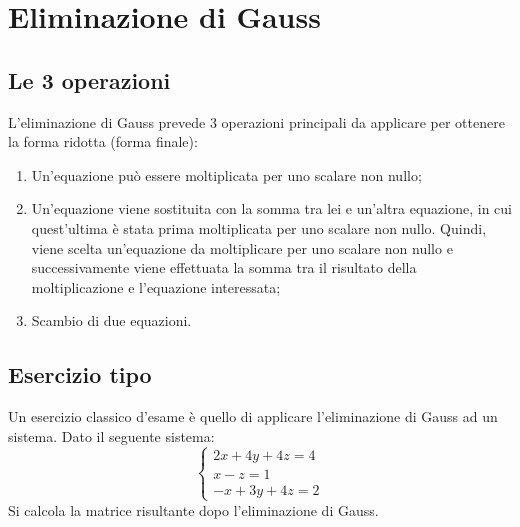 \documentclass[a4paper]{article}
\begin{document}
	\section{Eliminazione di Gauss}
	
	\subsection{Le 3 operazioni}
	
	L'eliminazione di Gauss prevede 3 operazioni principali da applicare per ottenere la forma ridotta (forma finale):
	\begin{enumerate}
		\item Un'equazione può essere moltiplicata per uno scalare non nullo;
		
		\item Un'equazione viene sostituita con la somma tra lei e un'altra equazione, in cui quest'ultima è stata prima moltiplicata per uno scalare non nullo. Quindi, viene scelta un'equazione da moltiplicare per uno scalare non nullo e successivamente viene effettuata la somma tra il risultato della moltiplicazione e l'equazione interessata;
		
		\item Scambio di due equazioni.
	\end{enumerate}

	\subsection{Esercizio tipo}
	
	Un esercizio classico d'esame è quello di applicare l'eliminazione di Gauss ad un sistema. Dato il seguente sistema:
	\begin{equation*}
		\begin{cases}
			2x + 4y + 4z = 4 \\
			x - z = 1 \\
			-x + 3y + 4z = 2
		\end{cases}
	\end{equation*}
	Si calcola la matrice risultante dopo l'eliminazione di Gauss.\newline
	
\end{document}

